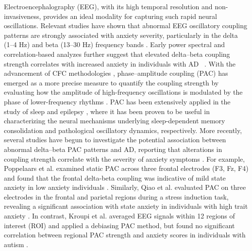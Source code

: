 \documentclass[lettersize,journal]{IEEEtran}
\begin{document}
Electroencephalography (EEG), with its high temporal resolution and non-invasiveness, provides an ideal modality for capturing such rapid neural oscillations.
Relevant studies have shown that abnormal EEG oscillatory coupling patterns are strongly associated with anxiety severity, particularly in the delta (1–4 Hz) and beta (13–30 Hz) frequency bands   \cite{knyazev2011cross}.
Early power spectral and correlation-based analyzes further suggest that elevated delta–beta coupling strength correlates with increased anxiety in individuals with AD~  \cite{knyazev2006anxious, davidson2000while}.  
With the advancement of CFC methodologies   \cite{aru2015untangling}, phase–amplitude coupling (PAC) has emerged as a more precise measure to quantify the coupling strength by evaluating how the amplitude of high-frequency oscillations is modulated by the phase of lower-frequency rhythms   \cite{tort2010measuring}. 
PAC has been extensively applied in the study of sleep   \cite{bergmann2018phase} and epilepsy  \cite{lu2024eeg}, where it has been proven to be useful in characterizing the neural mechanisms underlying sleep-dependent memory consolidation and pathological oscillatory dynamics, respectively. More recently, several studies have begun to investigate the potential association between abnormal delta–beta PAC patterns and AD, reporting that alterations in coupling strength correlate with the severity of anxiety symptoms  \cite{al2020review}. 
For example, Poppelaars et al. examined static PAC across three frontal electrodes (F3, Fz, F4) and found that the frontal delta-beta coupling was indicative of mild state anxiety in low anxiety individuals  \cite{poppelaars2018frontal}.
Similarly, Qiao et al. evaluated PAC on three electrodes in the frontal and parietal regions during a stress induction task, revealing a significant association with state anxiety in individuals with high trait anxiety  \cite{qiao2024anticipation}.
In contrast, Kroupi et al. averaged EEG signals within 12 regions of interest (ROI) and applied a debiasing PAC method, but found no significant correlation between regional PAC strength and anxiety scores in individuals with autism  \cite{kroupi2024age}.
\end{document}
